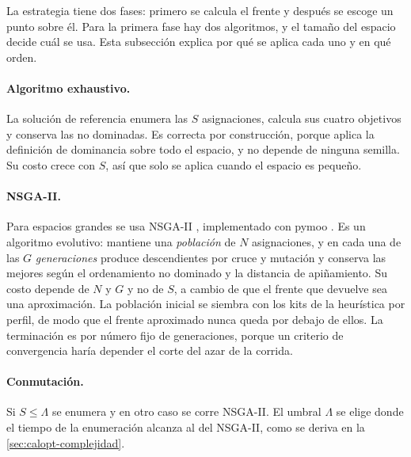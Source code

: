 La estrategia tiene dos fases: primero se calcula el frente y después se escoge
un punto sobre él. Para la primera fase hay dos algoritmos, y el tamaño del
espacio decide cuál se usa. Esta subsección explica por qué se aplica cada uno
y en qué orden.

\paragraph{Algoritmo exhaustivo.} La solución de referencia enumera las $S$
asignaciones, calcula sus cuatro objetivos y conserva las no dominadas. Es
correcta por construcción, porque aplica la definición de dominancia sobre todo
el espacio, y no depende de ninguna semilla. Su costo crece con $S$, así que
solo se aplica cuando el espacio es pequeño.

\paragraph{NSGA-II.} Para espacios grandes se usa NSGA-II
\cite{deb_fast_2002}, implementado con pymoo \cite{blank_pymoo_2020}. Es un
algoritmo evolutivo: mantiene una \emph{población} de $N$ asignaciones, y en
cada una de las $G$ \emph{generaciones} produce descendientes por cruce y
mutación y conserva las mejores según el ordenamiento no dominado y la distancia
de apiñamiento. Su costo depende de $N$ y $G$ y no de $S$, a cambio de que el
frente que devuelve sea una aproximación. La población inicial se siembra con
los kits de la heurística por perfil, de modo que el frente aproximado nunca
queda por debajo de ellos. La terminación es por número fijo de generaciones,
porque un criterio de convergencia haría depender el corte del azar de la
corrida.

\paragraph{Conmutación.} Si $S\leq\Lambda$ se enumera y en otro caso se corre
NSGA-II. El umbral $\Lambda$ se elige donde el tiempo de la enumeración alcanza
al del NSGA-II, como se deriva en la \cref{sec:calopt-complejidad}.

